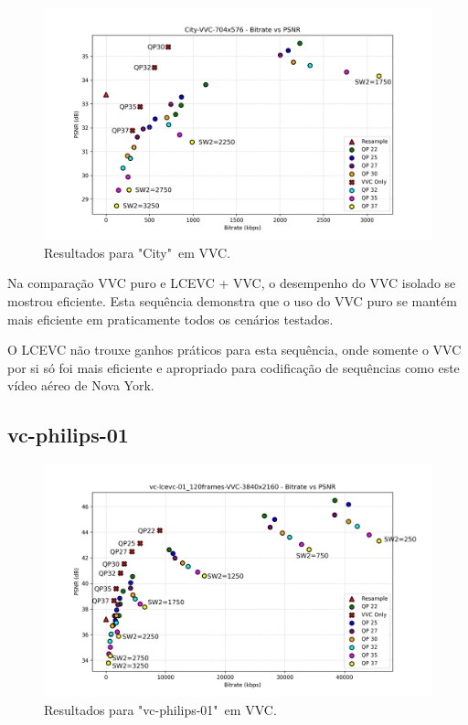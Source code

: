 \begin{figure}[h]
    \centering
    \includegraphics[width=1.0\textwidth]{img/City-VVC.png}
    \caption{Resultados para "City"\ em \acrshort{VVC}. \cite{xiph}}
    \label{fig:City-VVC}
\end{figure}

Na comparação \acrshort{VVC} puro e \acrshort{LCEVC} + \acrshort{VVC}, o desempenho
do \acrshort{VVC} isolado se mostrou eficiente. Esta sequência demonstra que o uso do
\acrshort{VVC} puro se mantém mais eficiente em praticamente todos os cenários testados.

O \acrshort{LCEVC} não trouxe ganhos práticos para esta sequência, onde somente o
\acrshort{VVC} por si só foi mais eficiente e apropriado para codificação de sequências
como este vídeo aéreo de Nova York.

\newpage

\subsection{vc-philips-01}

\begin{figure}[h]
    \centering
    \includegraphics[width=1.0\textwidth]{img/vc-lcevc-01_120frames-VVC.png}
    \caption{Resultados para "vc-philips-01"\ em \acrshort{VVC}.}
    \label{fig:vc-philips-01-VVC}
\end{figure}

